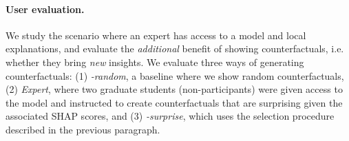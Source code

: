 



\newcommand{\cshap}{\emph{\sysname-surprise}\xspace}
\newcommand{\crandom}{\emph{\sysname-random}\xspace}
\newcommand{\chuman}{\emph{Expert}\xspace}

\paragraph{User evaluation.} We study the scenario where an expert has access to a model and local explanations, and evaluate the \emph{additional} benefit of showing counterfactuals, i.e. whether they bring \emph{new} insights. 
We evaluate three ways of generating counterfactuals: (1) \crandom, a baseline where we show random \sysname{} counterfactuals, (2) \chuman, where two graduate students (non-participants) were given access to the model and instructed to create counterfactuals that are surprising given the associated SHAP scores, and (3) \cshap, which uses the selection procedure described in the previous paragraph.

